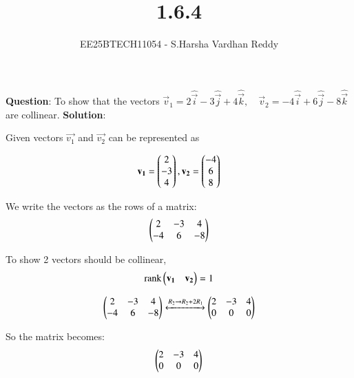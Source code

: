 \documentclass[journal]{IEEEtran}
\begin{document}
	
	
	\vspace{3cm}
	
	\title{1.6.4}
	\author{EE25BTECH11054 - S.Harsha Vardhan Reddy}
	\maketitle
	{\let\newpage\relax\maketitle}
	
	\renewcommand{\thefigure}{\theenumi}
	\renewcommand{\thetable}{\theenumi}
	\setlength{\intextsep}{10pt} %
	
	
	\renewcommand{\thetable}{\theenumi}
	
	\textbf{Question}:
To show that the vectors 
$\vec{v}_1 = 2\hat{\vec{i}} - 3\hat{\vec{j}} + 4\hat{\vec{k}}, \quad \vec{v}_2 = -4\hat{\vec{i}} + 6\hat{\vec{j}} - 8\hat{\vec{k}}$
are collinear.
\textbf{Solution}:

Given vectors $\vec{v_1}$ and $\vec{v_2}$ can be represented as

\begin{align}
\mathbf{v_1}=\begin{pmatrix}2 \\ -3 \\ 4 \end{pmatrix} , \mathbf{v_2}=\begin{pmatrix}-4 \\ 6 \\8 \end{pmatrix}
\end{align}

We write the vectors as the rows of a matrix:
\begin{align}
\begin{pmatrix}
2 & -3 & 4 \\
-4 & 6 & -8
\end{pmatrix}
\end{align}

 To show 2 vectors should be collinear,
\begin{align}
\text{rank}\begin{pmatrix}\mathbf{v_1} & \mathbf{v_2}\end{pmatrix} = 1
\end{align}

\begin{align}
\begin{pmatrix}
2 & -3 & 4 \\ -4 & 6 & -8 \end{pmatrix} \xleftrightarrow{R_2 \rightarrow R_2 + 2R_1} \begin{pmatrix}2 & -3 & 4 \\ 0 & 0 & 0\end{pmatrix}
\end{align}

So the matrix becomes:
\begin{align}
\begin{pmatrix}
2 & -3 & 4 \\
0 & 0 & 0
\end{pmatrix}
\end{align}
\end{document}
